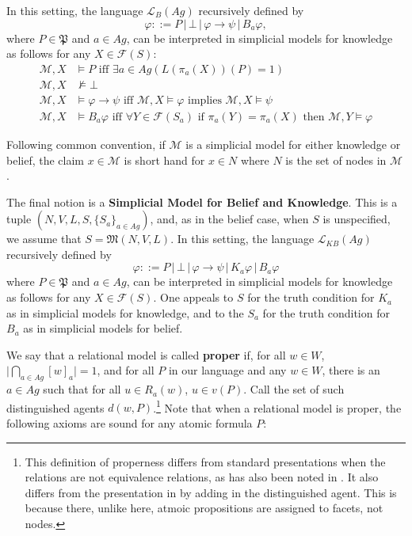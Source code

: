 \documentclass[11pt]{article}
\theoremstyle{definition}
\newcommand{\M}{\mathcal{M}}
\newcommand{\defin}[1]{\textbf{#1}}
\renewcommand{\phi}{\varphi}
\newcommand{\lthen}{\rightarrow}
\newcommand{\F}{\mathcal{F}}
\renewcommand{\M}{\mathcal{M}}
\renewcommand{\L}{\mathcal{L}}
\begin{document}
	In this setting, the language $\L_{B}(Ag)$ recursively defined by
	$$\varphi ::= P \, | \, \bot \, | \, \phi \lthen \psi \, | \, B_{a}\phi,$$
	where $P \in \mathfrak{P}$ and $a \in Ag$, can be interpreted in simplicial models for knowledge as follows for any $X\in\F(S)$:
	\begin{align*}
		\M,X & \models P \text{ iff } \exists a\in Ag(L(\pi_a(X))(P)=1)\\
		\M,X & \nvDash \bot\\
		\M,X & \models \phi \lthen \psi \text{ iff } \M,X \models \phi \text{ implies } \M,X \models \psi\\
		\M,X & \models B_a \phi \text{ iff } \forall Y \in \F(S_a) \text{ if } \pi_a(Y) = \pi_a(X) \text{ then } \M,Y \models \phi
	\end{align*}
	
	Following common convention, if $\M$ is a simplicial model for either knowledge or belief, the claim $x\in\M$ is short hand for $x\in N$ where $N$ is the set of nodes in $\M$.
	
	The final notion is a \defin{Simplicial Model for Belief and Knowledge}. This is a tuple $(N,V,L,S,\{S_a\}_{a\in Ag})$, and, as in the belief case, when $S$ is unspecified, we assume that $S=\mathfrak{M}(N,V,L)$. 	In this setting, the language $\L_{KB}(Ag)$ recursively defined by
	$$\varphi ::= P \, | \, \bot \, | \, \phi \lthen \psi \, | \, K_{a}\phi \, | \, B_{a}\phi$$
	where $P \in \mathfrak{P}$ and $a \in Ag$, can be interpreted in simplicial models for knowledge as follows for any $X\in\F(S)$. One appeals to $S$ for the truth condition for $K_a$ as in simplicial models for knowledge, and to the $S_a$ for the truth condition for $B_a$ as in simplicial models for belief.
	
	We say that a relational model is called \defin{proper} if, for all $w \in W$, $\big|\bigcap_{a \in Ag} [w]_{a} \big| = 1$, and for all $P$ in our language and any $w\in W$, there is an $a\in Ag$ such that for all $u\in R_a(w)$, $u\in v(P)$. Call the set of such distinguished agents $d(w,P)$.\footnote{This definition of properness differs from standard presentations when the relations are not equivalence relations, as has also been noted in \cite{Lehnherr_2025}. It also differs from the presentation in \cite{BelSimp} by adding in the distinguished agent. This is because there, unlike here, atmoic propositions are assigned to facets, not nodes.} Note that when a relational model is proper, the following axioms are sound for any atomic formula $P$:
	
\end{document}
